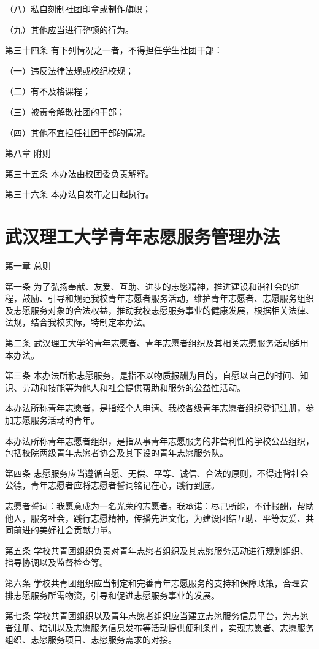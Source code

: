 \documentclass[UTF8,12pt,a4paper]{report}
\begin{document}
（八）私自刻制社团印章或制作旗帜；

（九）其他应当进行整顿的行为。

第三十四条  有下列情况之一者，不得担任学生社团干部：

（一）违反法律法规或校纪校规；

（二）有不及格课程；

（三）被责令解散社团的干部；

（四）其他不宜担任社团干部的情况。



第八章  附则

第三十五条  本办法由校团委负责解释。

第三十六条  本办法自发布之日起执行。  

\chapter{武汉理工大学青年志愿服务管理办法}
第一章  总则

第一条 为了弘扬奉献、友爱、互助、进步的志愿精神，推进建设和谐社会的进程，鼓励、引导和规范我校青年志愿者服务活动，维护青年志愿者、志愿服务组织及志愿服务对象的合法权益，推动我校志愿服务事业的健康发展，根据相关法律、法规，结合我校实际，特制定本办法。

第二条 武汉理工大学的青年志愿者、青年志愿者组织及其相关志愿服务活动适用本办法。

第三条 本办法所称志愿服务，是指不以物质报酬为目的，自愿以自己的时间、知识、劳动和技能等为他人和社会提供帮助和服务的公益性活动。

本办法所称青年志愿者，是指经个人申请、我校各级青年志愿者组织登记注册，参加志愿服务活动的青年。

本办法所称青年志愿者组织，是指从事青年志愿服务的非营利性的学校公益组织，包括校院两级青年志愿者协会及其下设的青年志愿服务队。

第四条 志愿服务应当遵循自愿、无偿、平等、诚信、合法的原则，不得违背社会公德，青年志愿者应将志愿者誓词铭记在心，践行到底。

志愿者誓词：我愿意成为一名光荣的志愿者。我承诺：尽己所能，不计报酬，帮助他人，服务社会，践行志愿精神，传播先进文化，为建设团结互助、平等友爱、共同前进的美好社会贡献力量。

第五条 学校共青团组织负责对青年志愿者组织及其志愿服务活动进行规划组织、指导协调以及监督检查等。

第六条 学校共青团组织应当制定和完善青年志愿服务的支持和保障政策，合理安排志愿服务所需物资，引导和促进志愿服务事业的发展。

第七条 学校共青团组织以及青年志愿者组织应当建立志愿服务信息平台，为志愿者注册、培训以及志愿服务信息发布等活动提供便利条件，实现志愿者、志愿服务组织、志愿服务项目、志愿服务需求的对接。
\end{document}
